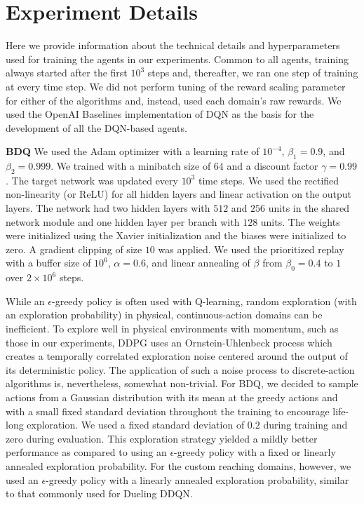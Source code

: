 \documentclass[letterpaper]{article}
\newcommand{\citep}{\cite}
\begin{document}
\section{Experiment Details}
\label{sec:exp_details}

Here we provide information about the technical details and hyperparameters used for training the agents in our experiments. Common to all agents, training always started after the first $10^3$ steps and, thereafter, we ran one step of training at every time step. We did not perform tuning of the reward scaling parameter for either of the algorithms and, instead, used each domain's raw rewards. We used the OpenAI Baselines \citep{baselines} implementation of DQN as the basis for the development of all the DQN-based agents.

\textbf{BDQ} We used the Adam optimizer \citep{Kingma:2015adam} with a learning rate of $10^{-4}$, $\beta_1 = 0.9$, and $\beta_2 = 0.999$. We trained with a minibatch size of $64$ and a discount factor  $\gamma =0.99$. The target network was updated every $10^3$ time steps. We used the rectified non-linearity (or ReLU) \citep{Glorot:2011ReLU} for all hidden layers and linear activation on the output layers. The network had two hidden layers with $512$ and $256$ units in the shared network module and one hidden layer per branch with $128$ units. The weights were initialized using the Xavier initialization \citep{Glorot:2010xavier} and the biases were initialized to zero. A gradient clipping of size $10$ was applied. We used the prioritized replay with a buffer size of $10^{6}$, $\alpha = 0.6$, and linear annealing of $\beta$ from $\beta_0 = 0.4$ to $1$ over $2 \times 10^{6}$ steps.

While an $\epsilon$-greedy policy is often used with Q-learning, random exploration (with an exploration probability) in physical, continuous-action domains can be inefficient. To explore well in physical environments with momentum, such as those in our experiments, DDPG uses an Ornstein-Uhlenbeck process \citep{Uhlenbeck:1930theory} which creates a temporally correlated exploration noise centered around the output of its deterministic policy. The application of such a noise process to discrete-action algorithms is, nevertheless, somewhat non-trivial. For BDQ, we decided to sample actions from a Gaussian distribution with its mean at the greedy actions and with a small fixed standard deviation throughout the training to encourage life-long exploration. We used a fixed standard deviation of $0.2$ during training and zero during evaluation. This exploration strategy yielded a mildly better performance as compared to using an $\epsilon$-greedy policy with a fixed or linearly annealed exploration probability. For the custom reaching domains, however, we used an $\epsilon$-greedy policy with a linearly annealed exploration probability, similar to that commonly used for Dueling DDQN.
\end{document}
